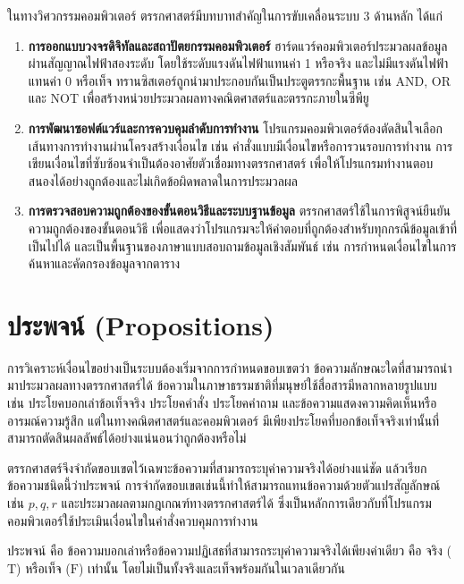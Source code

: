ในทางวิศวกรรมคอมพิวเตอร์ ตรรกศาสตร์มีบทบาทสำคัญในการขับเคลื่อนระบบ 3 ด้านหลัก ได้แก่

\begin{enumerate}
    \item \textbf{การออกแบบวงจรดิจิทัลและสถาปัตยกรรมคอมพิวเตอร์} ฮาร์ดแวร์คอมพิวเตอร์ประมวลผลข้อมูลผ่านสัญญาณไฟฟ้าสองระดับ โดยใช้ระดับแรงดันไฟฟ้าแทนค่า 1 หรือจริง และไม่มีแรงดันไฟฟ้าแทนค่า 0 หรือเท็จ ทรานซิสเตอร์ถูกนำมาประกอบกันเป็นประตูตรรกะพื้นฐาน เช่น AND, OR และ NOT เพื่อสร้างหน่วยประมวลผลทางคณิตศาสตร์และตรรกะภายในซีพียู
    
    \item \textbf{การพัฒนาซอฟต์แวร์และการควบคุมลำดับการทำงาน} โปรแกรมคอมพิวเตอร์ต้องตัดสินใจเลือกเส้นทางการทำงานผ่านโครงสร้างเงื่อนไข เช่น คำสั่งแบบมีเงื่อนไขหรือการวนรอบการทำงาน การเขียนเงื่อนไขที่ซับซ้อนจำเป็นต้องอาศัยตัวเชื่อมทางตรรกศาสตร์ เพื่อให้โปรแกรมทำงานตอบสนองได้อย่างถูกต้องและไม่เกิดข้อผิดพลาดในการประมวลผล
    
    \item \textbf{การตรวจสอบความถูกต้องของขั้นตอนวิธีและระบบฐานข้อมูล} ตรรกศาสตร์ใช้ในการพิสูจน์ยืนยันความถูกต้องของขั้นตอนวิธี เพื่อแสดงว่าโปรแกรมจะให้คำตอบที่ถูกต้องสำหรับทุกกรณีข้อมูลเข้าที่เป็นไปได้ และเป็นพื้นฐานของภาษาแบบสอบถามข้อมูลเชิงสัมพันธ์ เช่น การกำหนดเงื่อนไขในการค้นหาและคัดกรองข้อมูลจากตาราง
\end{enumerate}

\section{ประพจน์ (Propositions)}
\label{sec:propositions}

การวิเคราะห์เงื่อนไขอย่างเป็นระบบต้องเริ่มจากการกำหนดขอบเขตว่า ข้อความลักษณะใดที่สามารถนำมาประมวลผลทางตรรกศาสตร์ได้ ข้อความในภาษาธรรมชาติที่มนุษย์ใช้สื่อสารมีหลากหลายรูปแบบ เช่น ประโยคบอกเล่าข้อเท็จจริง ประโยคคำสั่ง ประโยคคำถาม และข้อความแสดงความคิดเห็นหรืออารมณ์ความรู้สึก แต่ในทางคณิตศาสตร์และคอมพิวเตอร์ มีเพียงประโยคที่บอกข้อเท็จจริงเท่านั้นที่สามารถตัดสินผลลัพธ์ได้อย่างแน่นอนว่าถูกต้องหรือไม่

ตรรกศาสตร์จึงจำกัดขอบเขตไว้เฉพาะข้อความที่สามารถระบุค่าความจริงได้อย่างแน่ชัด แล้วเรียกข้อความชนิดนี้ว่าประพจน์ การจำกัดขอบเขตเช่นนี้ทำให้สามารถแทนข้อความด้วยตัวแปรสัญลักษณ์ เช่น $p, q, r$ และประมวลผลตามกฎเกณฑ์ทางตรรกศาสตร์ได้ ซึ่งเป็นหลักการเดียวกับที่โปรแกรมคอมพิวเตอร์ใช้ประเมินเงื่อนไขในคำสั่งควบคุมการทำงาน

\begin{definition}[ประพจน์]
ประพจน์ คือ ข้อความบอกเล่าหรือข้อความปฏิเสธที่สามารถระบุค่าความจริงได้เพียงค่าเดียว คือ จริง ($\text{T}$) หรือเท็จ ($\text{F}$) เท่านั้น โดยไม่เป็นทั้งจริงและเท็จพร้อมกันในเวลาเดียวกัน~\parencite{epp2019discrete}
\end{definition}

